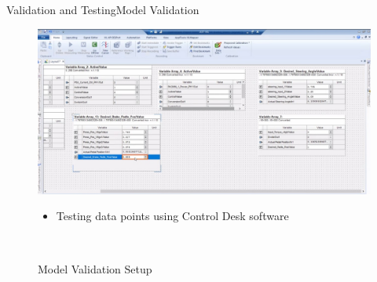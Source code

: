 \documentclass{beamer}
\begin{document}
\begin{frame}{Validation and Testing}{Model Validation}
	\begin{figure}
		\centering \includegraphics[width=.45\linewidth]{figs/img/aStuffValidationBrakeModel}\quad%
		\caption{Model Validation Setup}
    			\label{fig:validationSetup}
		\centering \begin{minipage}[b][0.4\textheight][c]{.45\linewidth} \begin{itemize} \item Testing data points using Control Desk software  \end{itemize} \end{minipage}\\[1em]
	\end{figure}
\end{frame}
\end{document}
